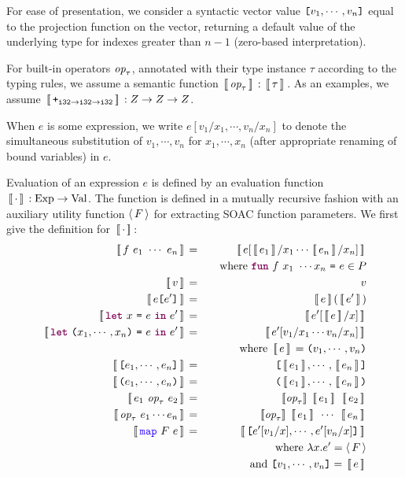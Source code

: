 \documentclass[oneside,11pt]{book}
\begin{document}
For ease of presentation, we consider a syntactic vector value $\texttt{[}v_1,\cdots,v_n\texttt{]}$ equal to the projection function on the vector, returning a default value of the underlying type for indexes greater than $n-1$ (zero-based interpretation).

For built-in operators $\mbox{\it{op}}_\tau$, annotated with their type
instance $\tau$ according to the typing rules, we assume a semantic
function $\,[\![\,\mbox{\it{op}}_\tau\,]\!]\, : \,[\![\,\tau\,]\!]\,$. As an examples, we assume
$\,[\![\,\texttt{+}_{\texttt{i32}\rightarrow\texttt{i32}\rightarrow\texttt{i32}}\,]\!]\, : Z \rightarrow Z \rightarrow Z$.

When $e$ is some expression, we write $e[v_1/x_1,\cdots,v_n/x_n]$ to
denote the simultaneous substitution of $v_1,\cdots,v_n$ for
$x_1,\cdots,x_n$ (after appropriate renaming of bound variables) in
$e$.



Evaluation of an expression $e$ is defined by an evaluation function
$\,[\![\,\cdot\,]\!]\, : \mathrm{Exp} \rightarrow \mathrm{Val}$. The function
is defined in a mutually recursive fashion with an auxiliary utility
function $\langle\,F\,\rangle$ for extracting SOAC function parameters. We
first give the definition for $\,[\![\,\cdot\,]\!]\,$:
\begin{eqnarray*}
  \Eval{f~e_1~\cdots~e_n} & = & \Eval{e[\Eval{e_1}/x_1\cdots \Eval{e_n}/x_n]} \\ & & ~~~ \mathrm{where}~\fw{fun}~f~x_1~ \cdots x_n ~\kw{=}~ e \in P \\
  \Eval{v} & = & v \\
  \Eval{e\kw{[}e'\kw{]}} & = & \Eval{e}(\Eval{e'}) \\
  \Eval{\fw{let}~x~\kw{=}~e~\fw{in}~e'} & = & \Eval{e'[\Eval{e}/x]} \\
  \Eval{\fw{let}~\kw{(}x_1,\cdots,x_n\kw{)}~\kw{=}~e~\fw{in}~e'} & = & \Eval{e'[v_1/x_1\cdots v_n/x_n]} \\ & & ~~~ \mathrm{where}~ \Eval{e} = \kw{(}v_1,\cdots,v_n\kw{)} \\
  \Eval{\kw{[}e_1,\cdots,e_n\kw{]}} & = & \kw{[}\Eval{e_1},\cdots,\Eval{e_n}\kw{]} \\
  \Eval{\kw{(}e_1,\cdots,e_n\kw{)}} & = & \kw{(}\Eval{e_1},\cdots,\Eval{e_n}\kw{)} \\
  \Eval{e_1~\id{op}_\tau~e_2} & = & \sem{\id{op}_\tau}~\Eval{e_1}~\Eval{e_2} \\
  \Eval{\id{op}_\tau~e_1\cdots e_n} & = & \sem{\id{op}_\tau}~\Eval{e_1}~\cdots~\Eval{e_n} \\
  \Eval{\fop{map}~F~e} & = & \Eval{\kw{[}e'[v_1/x],\cdots,e'[v_n/x]\kw{]}} \\
    & & ~~~\mathrm{where}~\lambda x . e' = \extractF{F} \\
    & & ~~~~~\mathrm{and}~ \kw{[}v_1,\cdots,v_n\kw{]} = \Eval{e}
\end{eqnarray*}
\end{document}
